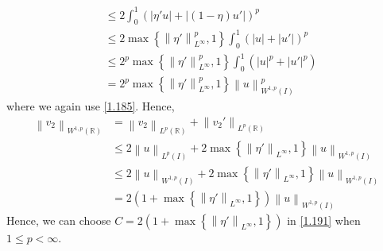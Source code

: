 \documentclass[a4paper,oneside]{book}
\numberwithin{equation}{chapter}
\begin{document}
\begin{enumerate}
\begin{align}
& \le 2\int_0^1 {{{\left( {\left| {\eta 'u} \right| + \left| {\left( {1 - \eta } \right)u'} \right|} \right)}^p}} \\
& \le 2\max \left\{ {\left\| {\eta '} \right\|_{{L^\infty }}^p,1} \right\}\int_0^1 {{{\left( {\left| u \right| + \left| {u'} \right|} \right)}^p}} \\
& \le {2^p}\max \left\{ {\left\| {\eta '} \right\|_{{L^\infty }}^p,1} \right\}\int_0^1 {\left( {{{\left| u \right|}^p} + {{\left| {u'} \right|}^p}} \right)} \\
& = {2^p}\max \left\{ {\left\| {\eta '} \right\|_{{L^\infty }}^p,1} \right\}\left\| u \right\|_{{W^{1,p}}\left( I \right)}^p
\end{align}
where we again use \eqref{1.185}. Hence, 
\begin{align}
{\left\| {{v_2}} \right\|_{{W^{1,p}}\left( \mathbb{R}  \right)}} &= {\left\| {{v_2}} \right\|_{{L^p}\left( \mathbb{R}  \right)}} + {\left\| {{v_2}'} \right\|_{{L^p}\left( \mathbb{R}  \right)}}\\
 &\le 2{\left\| u \right\|_{{L^p}\left( I \right)}} + 2\max \left\{ {{{\left\| {\eta '} \right\|}_{{L^\infty }}},1} \right\}{\left\| u \right\|_{{W^{1,p}}\left( I \right)}}\\
 &\le 2{\left\| u \right\|_{{W^{1,p}}\left( I \right)}} + 2\max \left\{ {{{\left\| {\eta '} \right\|}_{{L^\infty }}},1} \right\}{\left\| u \right\|_{{W^{1,p}}\left( I \right)}}\\
& = 2\left( {1 + \max \left\{ {{{\left\| {\eta '} \right\|}_{{L^\infty }}},1} \right\}} \right){\left\| u \right\|_{{W^{1,p}}\left( I \right)}}
\end{align}
Hence, we can choose $C = 2\left( {1 + \max \left\{ {{{\left\| {\eta '} \right\|}_{{L^\infty }}},1} \right\}} \right)$ in \eqref{1.191} when $1\le p<\infty$.
\end{enumerate}
\end{document}

